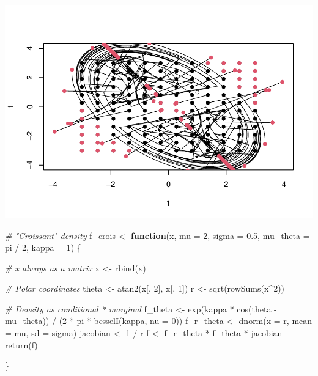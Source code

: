 \documentclass[
]{article}
\newenvironment{Shaded}{\begin{snugshade}}{\end{snugshade}}
\newcommand{\AttributeTok}[1]{\textcolor[rgb]{0.77,0.63,0.00}{#1}}
\newcommand{\CommentTok}[1]{\textcolor[rgb]{0.56,0.35,0.01}{\textit{#1}}}
\newcommand{\ControlFlowTok}[1]{\textcolor[rgb]{0.13,0.29,0.53}{\textbf{#1}}}
\newcommand{\DecValTok}[1]{\textcolor[rgb]{0.00,0.00,0.81}{#1}}
\newcommand{\FloatTok}[1]{\textcolor[rgb]{0.00,0.00,0.81}{#1}}
\newcommand{\FunctionTok}[1]{\textcolor[rgb]{0.00,0.00,0.00}{#1}}
\newcommand{\NormalTok}[1]{#1}
\newcommand{\OtherTok}[1]{\textcolor[rgb]{0.56,0.35,0.01}{#1}}
\newcommand{\SpecialCharTok}[1]{\textcolor[rgb]{0.00,0.00,0.00}{#1}}
\begin{document}
\includegraphics{prueba_files/figure-latex/unnamed-chunk-13-1.pdf}

\begin{Shaded}
\begin{Highlighting}[]
\CommentTok{\# "Croissant" density}
\NormalTok{f\_crois }\OtherTok{\textless{}{-}} \ControlFlowTok{function}\NormalTok{(x, }\AttributeTok{mu =} \DecValTok{2}\NormalTok{, }\AttributeTok{sigma =} \FloatTok{0.5}\NormalTok{, }\AttributeTok{mu\_theta =}\NormalTok{ pi }\SpecialCharTok{/} \DecValTok{2}\NormalTok{, }\AttributeTok{kappa =} \DecValTok{1}\NormalTok{) \{}

  \CommentTok{\# x always as a matrix}
\NormalTok{  x }\OtherTok{\textless{}{-}} \FunctionTok{rbind}\NormalTok{(x)}

  \CommentTok{\# Polar coordinates}
\NormalTok{  theta }\OtherTok{\textless{}{-}} \FunctionTok{atan2}\NormalTok{(x[, }\DecValTok{2}\NormalTok{], x[, }\DecValTok{1}\NormalTok{])}
\NormalTok{  r }\OtherTok{\textless{}{-}} \FunctionTok{sqrt}\NormalTok{(}\FunctionTok{rowSums}\NormalTok{(x}\SpecialCharTok{\^{}}\DecValTok{2}\NormalTok{))}

  \CommentTok{\# Density as conditional * marginal}
\NormalTok{  f\_theta }\OtherTok{\textless{}{-}} \FunctionTok{exp}\NormalTok{(kappa }\SpecialCharTok{*} \FunctionTok{cos}\NormalTok{(theta }\SpecialCharTok{{-}}\NormalTok{ mu\_theta)) }\SpecialCharTok{/} 
\NormalTok{    (}\DecValTok{2} \SpecialCharTok{*}\NormalTok{ pi }\SpecialCharTok{*} \FunctionTok{besselI}\NormalTok{(kappa, }\AttributeTok{nu =} \DecValTok{0}\NormalTok{))}
\NormalTok{  f\_r\_theta }\OtherTok{\textless{}{-}} \FunctionTok{dnorm}\NormalTok{(}\AttributeTok{x =}\NormalTok{ r, }\AttributeTok{mean =}\NormalTok{ mu, }\AttributeTok{sd =}\NormalTok{ sigma)}
\NormalTok{  jacobian }\OtherTok{\textless{}{-}} \DecValTok{1} \SpecialCharTok{/}\NormalTok{ r}
\NormalTok{  f }\OtherTok{\textless{}{-}}\NormalTok{ f\_r\_theta }\SpecialCharTok{*}\NormalTok{ f\_theta }\SpecialCharTok{*}\NormalTok{ jacobian}
  \FunctionTok{return}\NormalTok{(f)}

\NormalTok{\}}
\end{Highlighting}
\end{Shaded}
\end{document}
